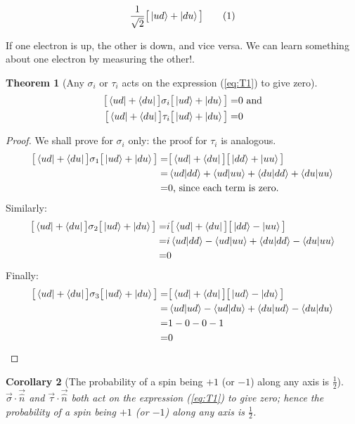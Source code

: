 \documentclass[]{article}
\newcommand\numberthis{\addtocounter{equation}{1}\tag{\theequation}}
\newtheorem{thm}{Theorem}
\newtheorem{cor}[thm]{Corollary}
\begin{document}
\begin{align*}
	\frac{1}{\sqrt{2}}\big[\ket{ud}+\ket{du}\big] \numberthis \label{eq:T1}
\end{align*}

If one electron is up, the other is down, and vice versa. We can learn something about one electron by measuring the other!.

\begin{thm}[Any $\sigma_i$ or $\tau_i$ acts on the expression (\ref{eq:T1}) to give zero]
	\begin{align*}
		\big[\bra{ud}+\bra{du}\big]\sigma_i\big[\ket{ud}+\ket{du}\big]=&0 \text{ and}\\
		\big[\bra{ud}+\bra{du}\big]\tau_i\big[\ket{ud}+\ket{du}\big]=&0
	\end{align*}
\end{thm}
\begin{proof}
	We shall prove for $\sigma_i$ only: the proof for $\tau_i$ is analogous.
	\begin{align*}
		\big[\bra{ud}+\bra{du}\big]\sigma_1\big[\ket{ud}+\ket{du}\big]=&\big[\bra{ud}+\bra{du}\big]\big[\ket{dd}+\ket{uu}\big]\\
		=&\braket{ud\vert dd} + \braket{ud\vert uu} + \braket{du\vert dd} + \braket{du\vert uu}\\
		=&0 \text{, since each term is zero.}
	\end{align*}
	Similarly:
	\begin{align*}
		\big[\bra{ud}+\bra{du}\big]\sigma_2\big[\ket{ud}+\ket{du}\big]=&i\big[\bra{ud}+\bra{du}\big]\big[\ket{dd}-\ket{uu}\big]\\
		=&i\braket{ud\vert dd} - \braket{ud\vert uu} + \braket{du\vert dd} - \braket{du\vert uu}\\
		=&0
	\end{align*}
	Finally:
	\begin{align*}
		\big[\bra{ud}+\bra{du}\big]\sigma_3\big[\ket{ud}+\ket{du}\big]=&\big[\bra{ud}+\bra{du}\big]\big[\ket{ud}-\ket{du}\big]\\
		=& \braket{ud\vert ud} - \braket{ud\vert du} + \braket{du\vert ud} - \braket{du\vert du}\\
		=& 1 -0 -0 -1\\
		=&0
	\end{align*}
\end{proof}
\begin{cor}[The probability of a spin being $+1$ (or $-1$) along any axis is $\frac{1}{2}$]
	$\vec{\sigma}\cdot\vec{\hat{n}}$ and $\vec{\tau}\cdot\vec{\hat{n}}$ both  act on the expression (\ref{eq:T1}) to give zero; hence the probability of a spin being $+1$ (or $-1$) along any axis is $\frac{1}{2}$.
\end{cor}
\end{document}
